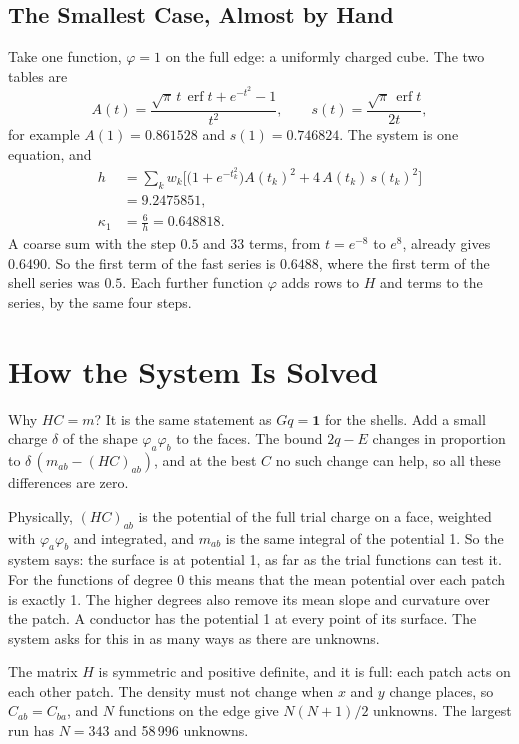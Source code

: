 \documentclass[journal]{IEEEtran}
\newcommand{\one}{\mathbf 1}
\newcommand{\erf}{\operatorname{erf}}
\begin{document}
\subsection{The Smallest Case, Almost by Hand}
Take one function, $\varphi = 1$ on the full edge: a uniformly charged cube. The two tables are
\begin{equation}
A(t) = \frac{\sqrt\pi\, t\, \erf t + e^{-t^2} - 1}{t^2}, \qquad s(t) = \frac{\sqrt\pi\, \erf t}{2t},
\end{equation}
for example $A(1) = 0.861528$ and $s(1) = 0.746824$. The system is one equation, and
\begin{align}
h &= \sum_k w_k \Big[ \big(1 + e^{-t_k^2}\big) A(t_k)^2 + 4\, A(t_k)\, s(t_k)^2 \Big] \nonumber\\
  &= 9.2475851, \\
\kappa_1 &= \frac6h = 0.648818 .
\end{align}
A coarse sum with the step $0.5$ and 33 terms, from $t = e^{-8}$ to $e^{8}$, already gives $0.6490$. So the first term of the fast series is $0.6488$, where the first term of the shell series was $0.5$. Each further function $\varphi$ adds rows to $H$ and terms to the series, by the same four steps.

\section{How the System Is Solved}
Why $HC = m$? It is the same statement as $Gq = \one$ for the shells. Add a small charge $\delta$ of the shape $\varphi_a\varphi_b$ to the faces. The bound $2q - E$ changes in proportion to $\delta\,(m_{ab} - (HC)_{ab})$, and at the best $C$ no such change can help, so all these differences are zero.

Physically, $(HC)_{ab}$ is the potential of the full trial charge on a face, weighted with $\varphi_a\varphi_b$ and integrated, and $m_{ab}$ is the same integral of the potential 1. So the system says: the surface is at potential 1, as far as the trial functions can test it. For the functions of degree 0 this means that the mean potential over each patch is exactly 1. The higher degrees also remove its mean slope and curvature over the patch. A conductor has the potential 1 at every point of its surface. The system asks for this in as many ways as there are unknowns.

The matrix $H$ is symmetric and positive definite, and it is full: each patch acts on each other patch. The density must not change when $x$ and $y$ change places, so $C_{ab} = C_{ba}$, and $N$ functions on the edge give $N(N+1)/2$ unknowns. The largest run has $N = 343$ and 58\,996 unknowns.
\end{document}
